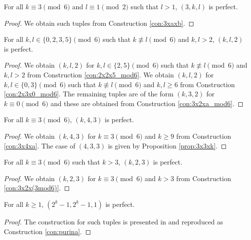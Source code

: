 \begin{prop}
\label{prop:thickness_3_2d_family}
For all $k \equiv 3 \pmod 6$ and $l \equiv 1 \pmod 2$ such that $l >1$, $(3,k,l)$ is perfect.
\end{prop}

\begin{proof}
We obtain such tuples from Construction \ref{con:3xaxb}.
\end{proof}

\begin{prop}
\label{prop:thickness_2_2d_family}
For all $k,l \in \{0,2,3,5\} \pmod 6$ such that $k \not\equiv l \pmod 6$ and $k,l > 2$, $(k,l,2)$ is perfect.
\end{prop}

\begin{proof}
We obtain $(k,l,2)$ for $k,l \in \{2,5\} \pmod 6$ such that $k \not\equiv l \pmod 6$ and $k,l > 2$ from Construction \ref{con:2x2x5_mod6}. We obtain $(k,l,2)$ for $k,l \in \{0,3\} \pmod 6$ such that $k \not\equiv l \pmod 6$ and $k,l \geq 6$ from Construction \ref{con:2x3x0_mod6}. The remaining tuples are of the form $(k,3,2)$ for $k \equiv 0 \pmod 6$ and these are obtained from Construction \ref{con:3x2xa_mod6}.
\end{proof}

\begin{prop}
\label{prop:thickness_3_width_4}
For all $k \equiv 3 \pmod 6$, $(k,4,3)$ is perfect.
\end{prop}

\begin{proof}
We obtain $(k,4,3)$ for $k \equiv 3 \pmod 6$ and $k \geq 9$ from Construction \ref{con:3x4xa}. The case of $(4,3,3)$ is given by Proposition \ref{prop:3x3xk}.
\end{proof}

\begin{prop}
\label{prop:2x3xk_3}
For all $k \equiv 3 \pmod 6$ such that $k>3$, $(k,2,3)$ is perfect.
\end{prop}

\begin{proof}
We obtain $(k,2,3)$ for $k \equiv 3 \pmod 6$ and $k > 3$ from Construction \ref{con:3x2x(3mod6)}.
\end{proof}

\begin{prop}
\label{prop:purina}
For all $k \geq 1$, $(2^k-1,2^k-1,1)$ is perfect.
\end{prop}

\begin{proof}
The construction for such tuples is presented in \cite{benevides:2021} and reproduced as Construction \ref{con:purina}.
\end{proof}

